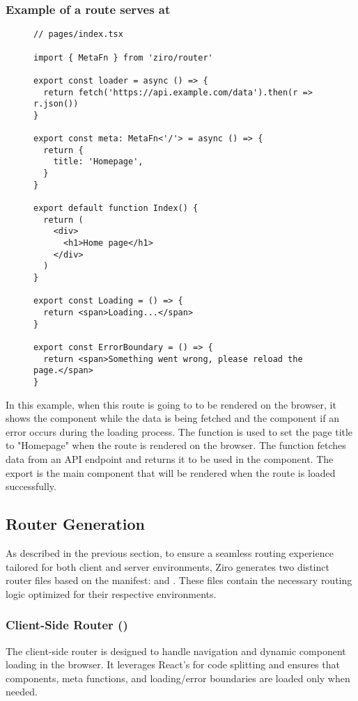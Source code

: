 \subsubsection{Example of a route serves at \cc{/}}
\begin{figure}[H]
\begin{verbatim}
// pages/index.tsx

import { MetaFn } from 'ziro/router'

export const loader = async () => {
  return fetch('https://api.example.com/data').then(r => r.json())
}

export const meta: MetaFn<'/'> = async () => {
  return {
    title: 'Homepage',
  }
}

export default function Index() {
  return (
    <div>
      <h1>Home page</h1>
    </div>
  )
}

export const Loading = () => {
  return <span>Loading...</span>
}

export const ErrorBoundary = () => {
  return <span>Something went wrong, please reload the page.</span>
}
\end{verbatim}
\end{figure}
In this example, when this route is going to to be rendered on the browser, it shows the  component while the data is being fetched and the  component if an error occurs during the loading process. The  function is used to set the page title to "Homepage" when the route is rendered on the browser. The  function fetches data from an API endpoint and returns it to be used in the component. The  export is the main component that will be rendered when the route is loaded successfully.
\pagebreak

\subsection{Router Generation}

As described in the previous section, to ensure a seamless routing experience tailored for both client and server environments, Ziro generates two distinct router files based on the manifest:  and . These files contain the necessary routing logic optimized for their respective environments.

\subsubsection{Client-Side Router ()}
The client-side router is designed to handle navigation and dynamic component loading in the browser. It leverages React’s  for code splitting and ensures that components, meta functions, and loading/error boundaries are loaded only when needed.

